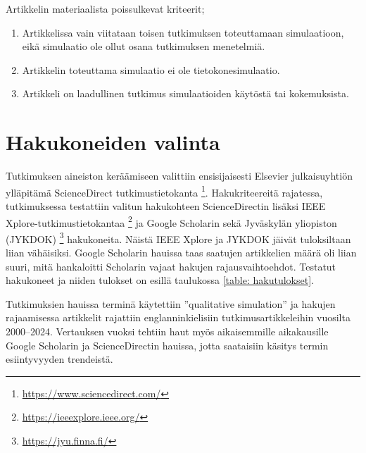 \documentclass[utf8]{gradu3}
\begin{document}
Artikkelin materiaalista poissulkevat kriteerit;
\begin{enumerate}
    \item Artikkelissa vain viitataan toisen tutkimuksen toteuttamaan simulaatioon, eikä simulaatio ole ollut osana tutkimuksen menetelmiä.
    \item Artikkelin toteuttama simulaatio ei ole tietokonesimulaatio.
    \item Artikkeli on laadullinen tutkimus simulaatioiden käytöstä tai kokemuksista.
\end{enumerate}

\section{Hakukoneiden valinta} \label{hakukoneiden valinta}
Tutkimuksen aineiston keräämiseen valittiin ensisijaisesti Elsevier julkaisuyhtiön 
ylläpitämä ScienceDirect tutkimustietokanta \footnote{\url{https://www.sciencedirect.com/}}.
Hakukriteereitä rajatessa, tutkimuksessa testattiin valitun hakukohteen ScienceDirectin lisäksi IEEE Xplore-tutkimustietokantaa 
\footnote{\url{https://ieeexplore.ieee.org/}} ja Google Scholarin 
sekä Jyväskylän yliopiston (JYKDOK) \footnote{\url{https://jyu.finna.fi/}} hakukoneita. Näistä IEEE Xplore ja JYKDOK jäivät tuloksiltaan liian vähäisiksi.
Google Scholarin hauissa taas saatujen artikkelien määrä oli liian suuri, 
mitä hankaloitti Scholarin vajaat hakujen rajausvaihtoehdot. 
Testatut hakukoneet ja niiden tulokset on esillä taulukossa \ref{table: hakutulokset}.

Tutkimuksien hauissa terminä käytettiin ''qualitative simulation'' 
ja hakujen rajaamisessa artikkelit 
rajattiin englanninkielisiin tutkimusartikkeleihin vuosilta 2000–2024. 
Vertauksen vuoksi tehtiin haut myös 
aikaisemmille aikakausille Google Scholarin ja ScienceDirectin hauissa,
jotta saataisiin käsitys termin esiintyvyyden trendeistä.
\end{document}

